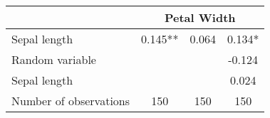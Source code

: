 \begin{tabular}[t]{lccc}
\toprule
& \multicolumn{3}{c}{Petal Width} \\
\midrule
Sepal length & 0.145** & 0.064 & 0.134*\\
Random variable &  &  & -0.124\\
Sepal length &  &  & 0.024\\
\midrule
Number of observations & 150 & 150 & 150\\
\bottomrule
\end{tabular}
